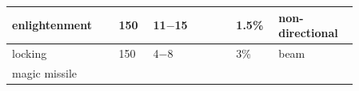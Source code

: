 \begin{longtable}{|>{\RaggedRight}p{0.27477\linewidth}|>{\RaggedRight}p{0.08330\linewidth}|>{\RaggedRight}p{0.21924\linewidth}|>{\RaggedRight}p{0.08716\linewidth}|>{\RaggedRight}p{0.19267\linewidth}|}
\hspace*{0pt}\ignorespaces{}\hspace*{0pt}enlightenment\footnotemark[28]&\hspace*{0pt}\ignorespaces{}\hspace*{0pt}150&\hspace*{0pt}\ignorespaces{}\hspace*{0pt}11{\mbox{$-$}}15&\hspace*{0pt}\ignorespaces{}\hspace*{0pt}1.5\%&\hspace*{0pt}\ignorespaces{}\hspace*{0pt}non-{}directional\\ \hline \hspace*{0pt}\ignorespaces{}\hspace*{0pt}locking\footnotemark[29]&\hspace*{0pt}\ignorespaces{}\hspace*{0pt}150&\hspace*{0pt}\ignorespaces{}\hspace*{0pt}4{\mbox{$-$}}8&\hspace*{0pt}\ignorespaces{}\hspace*{0pt}3\%&\hspace*{0pt}\ignorespaces{}\hspace*{0pt}beam\\ \hline \hspace*{0pt}\ignorespaces{}\hspace*{0pt}magic missile\footnotemark[30]&\hspace*{0pt}\ignorespaces
\end{longtable}
